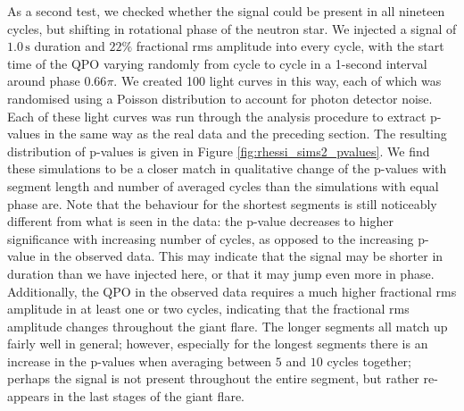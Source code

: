 \documentclass{emulateapj}
\begin{document}
As a second test, we checked whether the signal could be present in all nineteen cycles, but shifting in rotational phase of the neutron star. We injected a signal of $1.0\, \mathrm{s}$ duration and $22\%$ fractional rms amplitude into every cycle, with the start time of the QPO varying randomly from cycle to cycle in a 1-second interval around phase $0.66\pi$. We created 100 light curves in this way, each of which was randomised using a Poisson distribution to account for photon detector noise. Each of these light curves was run through the analysis procedure to extract p-values in the same way as the real data and the preceding section. 
The resulting distribution of p-values is given in Figure \ref{fig:rhessi_sims2_pvalues}. We find these simulations to be a closer match in qualitative change of the p-values with segment length and number of averaged cycles than the simulations with equal phase are. Note that the behaviour for the shortest segments is still noticeably different from what is seen in the data: the p-value decreases to higher significance with increasing number of cycles, as opposed to the increasing p-value in the observed data. This may indicate that the signal may be shorter in duration than we have injected here, or that it may jump even more in phase. Additionally, the QPO in the observed data requires a much higher fractional rms amplitude in at least one or two cycles, indicating that the fractional rms amplitude changes throughout the giant flare.
The longer segments all match up fairly well in general; however, especially for the longest segments there is an increase in the p-values when averaging between $5$ and $10$ cycles together; perhaps the signal is not present throughout the entire segment, but rather re-appears in the last stages of the giant flare.
\end{document}

